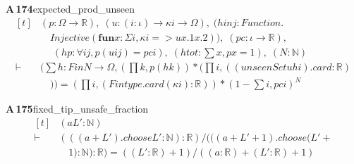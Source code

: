 \documentclass[conference]{IEEEtran}
\theoremstyle{definition}
\newcommand{\lean}[1]{\textsf{\footnotesize #1}}
\begin{document}
\noindent\textbf{A\,174}\quad\lean{expected\_prod\_unseen}
{\footnotesize\[ \begin{aligned}[t]
&(\mathit{p} : \Omega \to \mathbb{R} ),\; (\mathit{u} : (\mathit{i} : \iota ) \to \kappa \mathit{i} \to \Omega ),\; (\mathit{hinj} : \mathit{Function}.\\
&\quad \mathit{Injective} (\mathbf{fun} \mathit{x} : \Sigma \mathit{i}, \kappa \mathit{i} => \mathit{u} \mathit{x}.1 \mathit{x}.2)),\; (\mathit{pc} : \iota \to \mathbb{R} ),\\
&\quad \; (\mathit{hp} : \forall \mathit{i} \mathit{j}, \mathit{p} (\mathit{u} \mathit{i} \mathit{j}) = \mathit{pc} \mathit{i}),\; (\mathit{htot} : \textstyle\sum \mathit{x}, \mathit{p} \mathit{x} = 1),\; (\mathit{N} : \mathbb{N} )\\
\vdash\;&(\textstyle\sum \mathit{h} : \mathit{Fin} \mathit{N} \to \Omega , (\textstyle\prod \mathit{k}, \mathit{p} (\mathit{h} \mathit{k})) * (\textstyle\prod \mathit{i}, ((\mathit{unseenSet} \mathit{u} \mathit{h} \mathit{i}).\mathit{card} : \mathbb{R} )\\
&\quad )) = (\textstyle\prod \mathit{i}, (\mathit{Fintype}.\mathit{card} (\kappa \mathit{i}) : \mathbb{R} )) * (1 - \textstyle\sum \mathit{i}, \mathit{pc} \mathit{i}) ^{\mathit{N}}
\end{aligned} \]}

\noindent\textbf{A\,175}\quad\lean{fixed\_tip\_unsafe\_fraction}
{\footnotesize\[ \begin{aligned}[t]
&(\mathit{a} \mathit{L'} : \mathbb{N} )\\
\vdash\;&(((\mathit{a} + \mathit{L'}).\mathit{choose} \mathit{L'} : \mathbb{N} ) : \mathbb{R} ) / (((\mathit{a} + \mathit{L'} + 1).\mathit{choose} (\mathit{L'} +\\
&\quad 1) : \mathbb{N} ) : \mathbb{R} ) = ((\mathit{L'} : \mathbb{R} ) + 1) / ((\mathit{a} : \mathbb{R} ) + (\mathit{L'} : \mathbb{R} ) + 1)
\end{aligned} \]}
\end{document}
